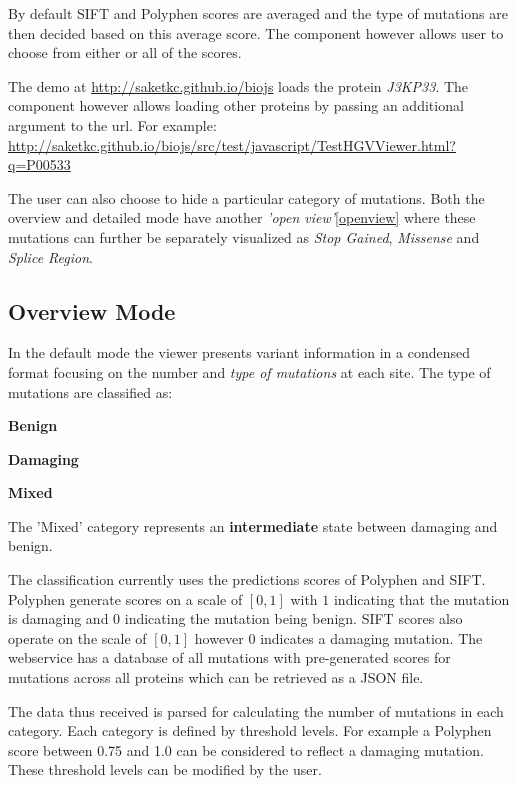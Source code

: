 \documentclass[twoside]{article}
\begin{document}
\begin{multicols}{2}
By default  SIFT and Polyphen scores are averaged and the type of mutations are then decided based on this average score. The component however allows user to choose from either or all of the scores.

The demo at \url{http://saketkc.github.io/biojs} loads the protein \textit{J3KP33}. The component however allows loading other proteins by passing an additional argument to the url. For example: \url{http://saketkc.github.io/biojs/src/test/javascript/TestHGVViewer.html?q=P00533}

The user can also choose to hide a particular category of mutations. Both the overview and detailed mode have another \textit{'open view'}\ref{openview} where these mutations can further be separately visualized as \textit{Stop Gained}, \textit{Missense} and \textit{Splice Region}.


\subsection{Overview Mode}
In the default mode the viewer presents variant information in a condensed format focusing on the number and \textit{type of mutations} at each site. The type of mutations are classified as:
\begin{compactitem}
\item \textbf{Benign} %
\item \textbf{Damaging} %
\item \textbf{Mixed}
\end{compactitem}

The 'Mixed' category represents an \textbf{intermediate} state between damaging and benign.


The classification currently uses the predictions scores of Polyphen\cite{Ramensky2002} and SIFT\cite{Kumar2009}. Polyphen generate scores on a scale of $[0,1]$ with $1$ indicating that the mutation is damaging and $0$ indicating the mutation being benign. SIFT scores also operate on the scale of $[0,1]$ however $0$ indicates a damaging mutation.
The webservice has a database of all mutations with pre-generated scores for mutations across all proteins which can be retrieved as a JSON file.

The data thus received is parsed for calculating the number of mutations in each category. Each category is defined by threshold levels. For example a Polyphen score between 0.75 and 1.0 can be considered to reflect a damaging mutation. These threshold levels can be modified by the user.


\end{multicols}
\end{document}
